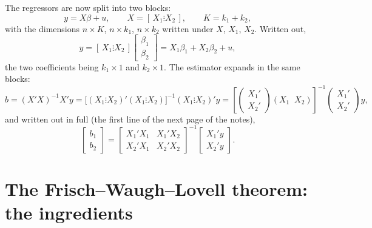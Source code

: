 \documentclass[11pt]{article}
\begin{document}
The regressors are now split into two blocks:
\[ y = X\beta + u, \qquad X = [\,X_{1} \vdots X_{2}\,], \qquad K = k_{1} + k_{2}, \]
with the dimensions $n\times K$, $n\times k_{1}$, $n\times k_{2}$ written under
$X$, $X_{1}$, $X_{2}$. Written out,
\[ y = [\,X_{1} \vdots X_{2}\,]\begin{bmatrix}\beta_{1}\\\hline\beta_{2}\end{bmatrix}
   = X_{1}\beta_{1} + X_{2}\beta_{2} + u, \]
the two coefficients being $k_{1}\times1$ and $k_{2}\times1$. The estimator
expands in the same blocks:
\[
b = (X'X)^{-1}X'y
  = \bigl[(X_{1} \vdots X_{2})'(X_{1} \vdots X_{2})\bigr]^{-1}(X_{1} \vdots X_{2})'y
  = \left[\begin{pmatrix}X_{1}'\\X_{2}'\end{pmatrix}(X_{1}\;\;X_{2})\right]^{-1}
    \begin{pmatrix}X_{1}'\\X_{2}'\end{pmatrix}y,
\]
and written out in full (the first line of the next page of the notes),
\[
\begin{bmatrix} b_{1} \\ b_{2} \end{bmatrix}
= \begin{bmatrix} X_{1}'X_{1} & X_{1}'X_{2} \\ X_{2}'X_{1} & X_{2}'X_{2} \end{bmatrix}^{-1}
  \begin{bmatrix} X_{1}'y \\ X_{2}'y \end{bmatrix}.
\]

\section{The Frisch--Waugh--Lovell theorem: the ingredients}
\end{document}
